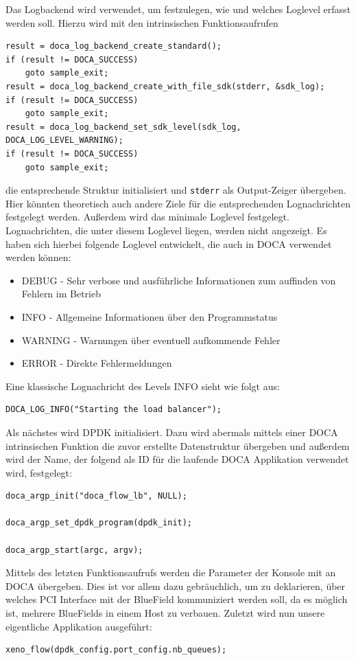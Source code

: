 Das Logbackend wird verwendet, um festzulegen, wie und welches Loglevel erfasst werden soll.
Hierzu wird mit den intrinsischen Funktionsaufrufen
\begin{verbatim}
result = doca_log_backend_create_standard();
if (result != DOCA_SUCCESS)
    goto sample_exit;
result = doca_log_backend_create_with_file_sdk(stderr, &sdk_log);
if (result != DOCA_SUCCESS)
    goto sample_exit;
result = doca_log_backend_set_sdk_level(sdk_log, DOCA_LOG_LEVEL_WARNING);
if (result != DOCA_SUCCESS)
    goto sample_exit;
\end{verbatim}
die entsprechende Struktur initialisiert und \texttt{stderr} als Output-Zeiger übergeben. Hier könnten theoretisch auch andere Ziele für die entsprechenden Lognachrichten festgelegt werden. Außerdem wird das minimale Loglevel festgelegt. Lognachrichten, die unter diesem Loglevel liegen, werden nicht angezeigt. Es haben sich hierbei folgende Loglevel entwickelt, die auch in DOCA verwendet werden können:
\begin{itemize}
    \item DEBUG - Sehr verbose und ausführliche Informationen zum auffinden von Fehlern im Betrieb
    \item INFO - Allgemeine Informationen über den Programmstatus
    \item WARNING - Warnungen über eventuell aufkommende Fehler
    \item ERROR - Direkte Fehlermeldungen
\end{itemize}
Eine klassische Lognachricht des Levels INFO sieht wie folgt aus:
\begin{verbatim}
DOCA_LOG_INFO("Starting the load balancer");
\end{verbatim}
Als nächstes wird DPDK initialisiert. Dazu wird abermals mittels einer DOCA intrinsischen Funktion die zuvor erstellte Datenstruktur übergeben und außerdem wird der Name, der folgend als ID für die laufende DOCA Applikation verwendet wird, festgelegt:
\begin{verbatim}
doca_argp_init("doca_flow_lb", NULL);

doca_argp_set_dpdk_program(dpdk_init);

doca_argp_start(argc, argv);
\end{verbatim}
Mittels des letzten Funktionsaufrufs werden die Parameter der Konsole mit an DOCA übergeben. Dies ist vor allem dazu gebräuchlich, um zu deklarieren, über welches PCI Interface mit der BlueField kommuniziert werden soll, da es möglich ist, mehrere BlueFields in einem Host zu verbauen.
Zuletzt wird nun unsere eigentliche Applikation ausgeführt:
\begin{verbatim}
xeno_flow(dpdk_config.port_config.nb_queues);
\end{verbatim}
